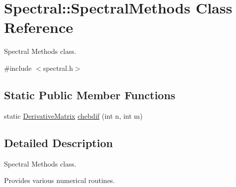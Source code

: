\hypertarget{class_spectral_1_1_spectral_methods}{\section{Spectral\+:\+:Spectral\+Methods Class Reference}
\label{class_spectral_1_1_spectral_methods}
}


Spectral Methods class.  




{\ttfamily \#include $<$spectral.\+h$>$}

\subsection*{Static Public Member Functions}
\begin{DoxyCompactItemize}
\item 
static \hyperlink{class_derivative_matrix}{Derivative\+Matrix} \hyperlink{class_spectral_1_1_spectral_methods_a1c2800845d57211683882cdfad0660e2}{chebdif} (int n, int m)
\end{DoxyCompactItemize}


\subsection{Detailed Description}
Spectral Methods class. 

Provides various numerical routines. 

